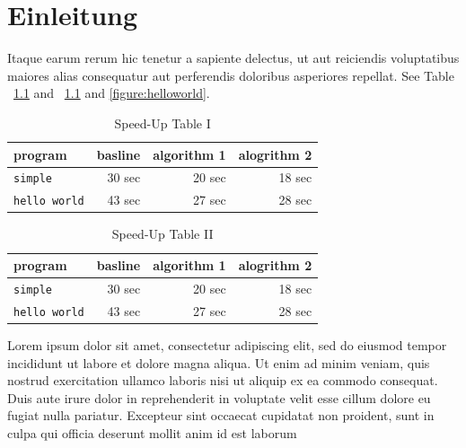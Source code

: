 
\chapter{Einleitung}\label{chapter:kapitellabel} %
 Itaque earum rerum hic tenetur a sapiente delectus, ut aut reiciendis voluptatibus maiores alias consequatur aut perferendis doloribus asperiores repellat\cite{aho:dragonbook}. See Table ~\ref{table:speedup1} and ~\ref{table:speedup1} and \ref{figure:helloworld}.

\begin{table}[!th]
  \renewcommand{\arraystretch}{1.3}
  \caption{Speed-Up Table I}\label{table:speedup1}   
  \vspace{4mm} %
  \centering
    \begin{tabular}{|l||r|r|r|}
      \hline      
      program            & basline   & algorithm 1  & alogrithm 2\\
      \hline      
      \hline
      {\tt simple}       &  30 sec   &  20 sec      &  18 sec     \\
      \hline
      {\tt hello world}  &  43 sec   &  27 sec      &  28 sec     \\
      \hline      
    \end{tabular}
\end{table}

\begin{table}[!th]
  \renewcommand{\arraystretch}{1.3}
  \caption{Speed-Up Table II}\label{table:speedup2}
  \vspace{4mm} %
  \centering
    \begin{tabular}{|l||r|r|r|}
      \hline      
      program            & basline   & algorithm 1  & alogrithm 2\\
      \hline      
      \hline
      {\tt simple}       &  30 sec   &  20 sec      &  18 sec     \\
      \hline
      {\tt hello world}  &  43 sec   &  27 sec      &  28 sec     \\
      \hline      
    \end{tabular}
\end{table}
Lorem ipsum dolor sit amet, consectetur adipiscing elit, sed do eiusmod tempor incididunt ut labore et dolore magna aliqua. Ut enim ad minim veniam, quis nostrud exercitation ullamco laboris nisi ut aliquip ex ea commodo consequat. Duis aute irure dolor in reprehenderit in voluptate velit esse cillum dolore eu fugiat nulla pariatur. Excepteur sint occaecat cupidatat non proident, sunt in culpa qui officia deserunt mollit anim id est laborum


